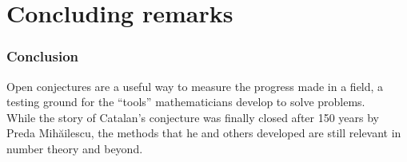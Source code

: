 \section{Concluding remarks}

\begin{frame}
\frametitle{Conclusion}

Open conjectures are a useful way to measure the progress made in a field, a testing ground for the ``tools'' mathematicians develop to solve problems. \\[1em]

While the story of Catalan's conjecture was finally closed after 150 years by Preda Mihăilescu, the methods that he and others developed are still relevant in number theory and beyond.
\end{frame}
